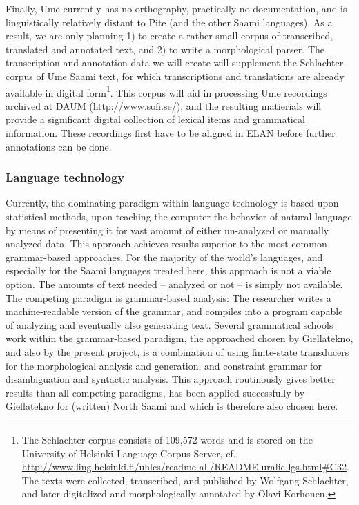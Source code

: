 \documentclass[a4paper,12pt]{article}
\begin{document}
Finally, Ume currently has no orthography, practically no documentation, and is linguistically relatively distant to Pite (and the other Saami languages). As a result, we are only planning 1) to create a rather small corpus of transcribed, translated and annotated text, and 2) to write a morphological parser. The transcription and annotation data we will create will supplement the Schlachter corpus of Ume Saami text, for which transcriptions and translations are already available in digital form\footnote{The Schlachter corpus consists of 109,572 words and is stored on the University of Helsinki Language Corpus Server, cf. \url{http://www.ling.helsinki.fi/uhlcs/readme-all/README-uralic-lgs.html#C32}. The texts were collected, transcribed, and published by Wolfgang Schlachter, and later digitalized and morphologically annotated by Olavi Korhonen.}. This corpus will aid in processing Ume recordings archived at DAUM (\url{http://www.sofi.se/}), and the resulting matierials will provide a significant digital collection of lexical items and grammatical information. These recordings first have to be aligned in ELAN before further annotations can be done. 

\subsubsection{Language technology}

Currently, the dominating paradigm within language technology is based upon statistical methods, upon teaching the computer the behavior of natural language by means of presenting it for vast amount of either un-analyzed or manually analyzed data. This approach achieves results superior to the most common grammar-based approaches. For the majority of the world's languages, and especially for the Saami languages treated here, this approach is not a viable option. The amounts of text needed – analyzed or not – is simply not available. The competing paradigm is grammar-based analysis: The researcher writes a machine-readable version of the grammar, and compiles into a program capable of analyzing and eventually also generating text. Several grammatical schools work within the grammar-based paradigm, the approached chosen by Giellatekno, and also by the present project, is a combination of using finite-state transducers for the morphological analysis and generation, and constraint grammar for disambiguation and syntactic analysis. This approach routinously gives better results than all competing paradigms, has been applied successfully by Giellatekno for (written) North Saami and which is therefore also chosen here.
\end{document}
